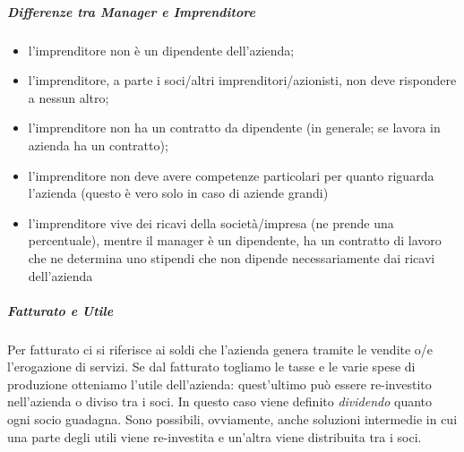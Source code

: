 \subparagraph*{Differenze tra Manager e Imprenditore}
\begin{itemize}
  \item l'imprenditore non è un dipendente dell'azienda;
  \item l'imprenditore, a parte i soci/altri imprenditori/azionisti, non deve
rispondere a nessun altro;
  \item l'imprenditore non ha un contratto da dipendente (in generale; se 
  lavora in azienda ha un contratto);
  \item l'imprenditore non deve avere competenze particolari per quanto riguarda
l'azienda (questo è vero solo in caso di aziende grandi)
  \item l'imprenditore vive dei ricavi della società/impresa (ne prende una
percentuale), mentre il manager è un dipendente, ha un contratto di lavoro che
ne determina uno stipendi che non dipende necessariamente dai ricavi
dell'azienda\\[0.5cm] 
\end{itemize}

\subparagraph*{Fatturato e Utile} Per fatturato ci si riferisce ai soldi che
l'azienda genera tramite le vendite o/e l'erogazione di servizi. Se dal
fatturato togliamo le tasse e le varie spese di produzione otteniamo l'utile
dell'azienda: quest'ultimo può essere re-investito nell'azienda o diviso tra
i soci. In questo caso viene definito \textit{dividendo} quanto ogni socio
guadagna. Sono possibili, ovviamente, anche soluzioni intermedie in cui una
parte degli utili viene re-investita e un'altra viene distribuita tra i soci.
